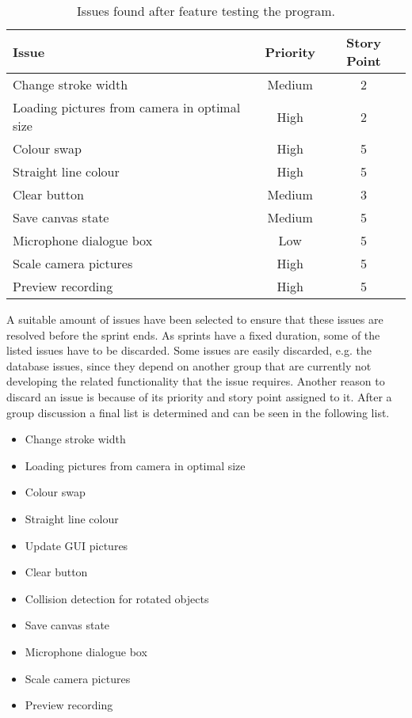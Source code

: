 \begin{table}[h]
\begin{tabular}{|p{5cm}|c|c|}
\hline 
Issue & Priority & Story Point \\ 
\hline 
Change stroke width & Medium & 2 \\ 
\hline 
Loading pictures from camera in optimal size & High & 2 \\ 
\hline 
Colour swap & High & 5 \\ 
\hline 
Straight line colour & High & 5 \\ 
\hline 
Clear button & Medium & 3 \\ 
\hline 
Save canvas state & Medium & 5 \\ 
\hline 
Microphone dialogue box & Low & 5 \\ 
\hline 
Scale camera pictures & High & 5 \\ 
\hline 
Preview recording & High & 5 \\ 
\hline 
\end{tabular}
\caption{Issues found after feature testing the program.}
\label{table:newissues}
\end{table}

A suitable amount of issues have been selected to ensure that these issues are resolved before the sprint ends.
As sprints have a fixed duration, some of the listed issues have to be discarded.
Some issues are easily discarded, e.g. the database issues, since they depend on another group that are currently not developing the related functionality that the issue requires.
Another reason to discard an issue is because of its priority and story point assigned to it.
After a group discussion a final list is determined and can be seen in the following list.

\begin{itemize}
	\item Change stroke width
	\item Loading pictures from camera in optimal size
	\item Colour swap
	\item Straight line colour
	\item Update GUI pictures
	\item Clear button
	\item Collision detection for rotated objects
	\item Save canvas state
	\item Microphone dialogue box
	\item Scale camera pictures
	\item Preview recording
\end{itemize}